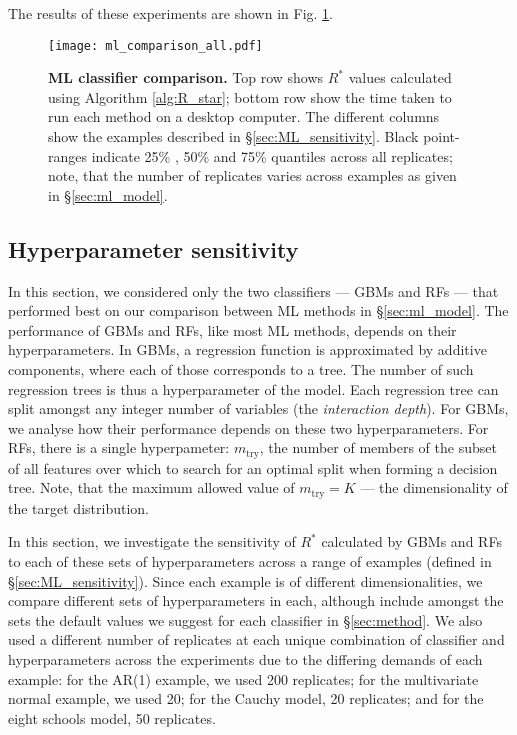 \documentclass{article}
\begin{document}
The results of these experiments are shown in Fig. \ref{fig:ml_comparison_all}.

\begin{figure}[!htb]
	\centerline{\texttt{[image: ml\_comparison\_all.pdf]}}
	\caption{\textbf{ML classifier comparison.} Top row shows $R^*$ values calculated using Algorithm \ref{alg:R_star}; bottom row show the time taken to run each method on a desktop computer. The different columns show the examples described in \S\ref{sec:ML_sensitivity}. Black point-ranges indicate 25\% , 50\% and 75\% quantiles across all replicates; note, that the number of replicates varies across examples as given in \S\ref{sec:ml_model}.}
	\label{fig:ml_comparison_all}
\end{figure}

\color{black}

\color{red}
\subsection{Hyperparameter sensitivity}\label{sec:hyperparameters}
In this section, we considered only the two classifiers — GBMs and RFs — that performed best on our comparison between ML methods in \S\ref{sec:ml_model}. The performance of GBMs and RFs, like most ML methods, depends on their hyperparameters. In GBMs, a regression function is approximated by additive components, where each of those corresponds to a tree. The number of such regression trees is thus a hyperparameter of the model. Each regression tree can split amongst any integer number of variables (the \textit{interaction depth}). For GBMs, we analyse how their performance depends on these two hyperparameters. For RFs, there is a single hyperpameter: $m_{\text{try}}$, the number of members of the subset of all features over which to search for an optimal split when forming a decision tree. Note, that the maximum allowed value of $m_{\text{try}}=K$ — the dimensionality of the target distribution. 

In this section, we investigate the sensitivity of $R^*$ calculated by GBMs and RFs to each of these sets of hyperparameters across a range of examples (defined in \S\ref{sec:ML_sensitivity}). Since each example is of different dimensionalities, we compare different sets of hyperparameters in each, although include amongst the sets the default values we suggest for each classifier in \S\ref{sec:method}. We also used a different number of replicates at each unique combination of classifier and hyperparameters across the experiments due to the differing demands of each example: for the AR(1) example, we used 200 replicates; for the multivariate normal example, we used 20; for the Cauchy model, 20 replicates; and for the eight schools model, 50 replicates.
\end{document}
